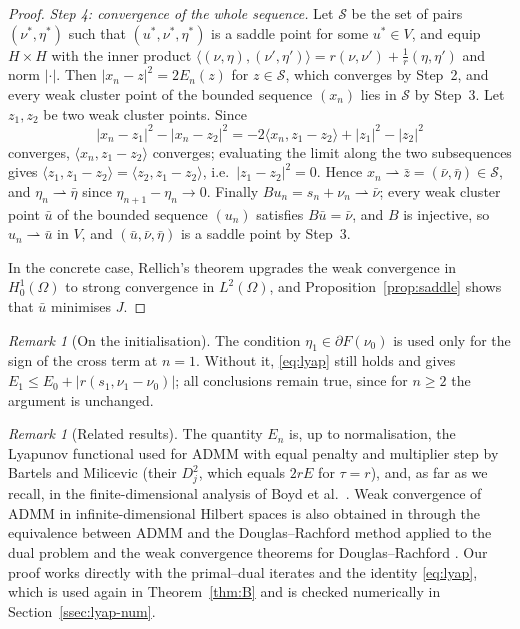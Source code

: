 \documentclass[11pt]{amsart}
\theoremstyle{definition}
\theoremstyle{remark}
\newtheorem{remark}[theorem]{Remark}
\numberwithin{equation}{section}
\newcommand{\Sad}{\mathcal{S}}
\newcommand{\abs}[1]{\lvert #1\rvert}
\newcommand{\weak}{\rightharpoonup}
\begin{document}
\begin{proof}
\emph{Step 4: convergence of the whole sequence.} Let $\Sad$ be the set of pairs $(\nu^*,\eta^*)$ such that $(u^*,\nu^*,\eta^*)$ is a saddle point for some $u^*\in V$, and equip $H\times H$ with the inner product $\langle(\nu,\eta),(\nu',\eta')\rangle=r(\nu,\nu')+\frac1r(\eta,\eta')$ and norm $\abs\cdot$. Then $\abs{x_n-z}^2=2E_n(z)$ for $z\in\Sad$, which converges by Step~2, and every weak cluster point of the bounded sequence $(x_n)$ lies in $\Sad$ by Step~3. Let $z_1,z_2$ be two weak cluster points. Since
\[
\abs{x_n-z_1}^2-\abs{x_n-z_2}^2=-2\langle x_n,z_1-z_2\rangle+\abs{z_1}^2-\abs{z_2}^2
\]
converges, $\langle x_n,z_1-z_2\rangle$ converges; evaluating the limit along the two subsequences gives $\langle z_1,z_1-z_2\rangle=\langle z_2,z_1-z_2\rangle$, i.e.\ $\abs{z_1-z_2}^2=0$. Hence $x_n\weak\bar z=(\bar\nu,\bar\eta)\in\Sad$, and $\eta_n\weak\bar\eta$ since $\eta_{n+1}-\eta_n\to0$. Finally $Bu_n=s_n+\nu_n\weak\bar\nu$; every weak cluster point $\bar u$ of the bounded sequence $(u_n)$ satisfies $B\bar u=\bar\nu$, and $B$ is injective, so $u_n\weak\bar u$ in $V$, and $(\bar u,\bar\nu,\bar\eta)$ is a saddle point by Step~3.

In the concrete case, Rellich's theorem upgrades the weak convergence in $H^1_0(\Omega)$ to strong convergence in $L^2(\Omega)$, and Proposition~\ref{prop:saddle} shows that $\bar u$ minimises $J$.
\end{proof}

\begin{remark}[On the initialisation]\label{rem:init}
The condition $\eta_1\in\partial F(\nu_0)$ is used only for the sign of the cross term at $n=1$. Without it, \eqref{eq:lyap} still holds and gives $E_1\le E_0+\abs{r(s_1,\nu_1-\nu_0)}$; all conclusions remain true, since for $n\ge2$ the argument is unchanged.
\end{remark}

\begin{remark}[Related results]\label{rem:A-literature}
The quantity $E_n$ is, up to normalisation, the Lyapunov functional used for ADMM with equal penalty and multiplier step by Bartels and Milicevic \cite[Thm.~3.7]{BartelsMilicevic2017} (their $D_j^2$, which equals $2rE$ for $\tau=r$), and, as far as we recall, in the finite-dimensional analysis of Boyd et al.\ \cite[App.~A]{Boyd2011ADMM}. Weak convergence of ADMM in infinite-dimensional Hilbert spaces is also obtained in \cite{MoradifamNachman2011} through the equivalence between ADMM and the Douglas--Rachford method applied to the dual problem \cite{Gabay1983,GlowinskiPanTai2016} and the weak convergence theorems for Douglas--Rachford \cite{LionsMercier1979,EcksteinBertsekas1992,Svaiter2011,BauschkeCombettes2017}. Our proof works directly with the primal--dual iterates and the identity \eqref{eq:lyap}, which is used again in Theorem~\ref{thm:B} and is checked numerically in Section~\ref{ssec:lyap-num}.
\end{remark}
\end{document}
